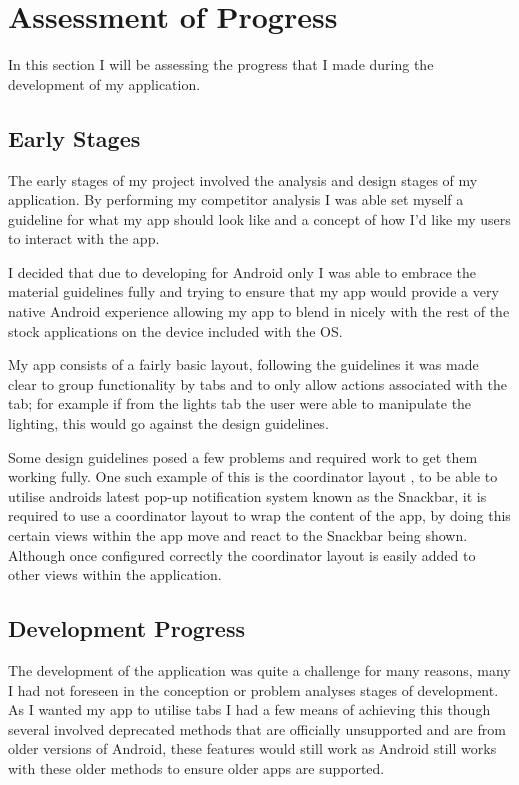 \section{Assessment of Progress}\label{assessment-of-progress}

In this section I will be assessing the progress that I made during the
development of my application.

\subsection{Early Stages}\label{early-stages}

The early stages of my project involved the analysis and design stages
of my application. By performing my competitor analysis I was able set
myself a guideline for what my app should look like and a concept of how
I'd like my users to interact with the app.

I decided that due to developing for Android only I was able to embrace
the material guidelines fully and trying to ensure that my app would
provide a very native Android experience allowing my app to blend in
nicely with the rest of the stock applications on the device included
with the OS.

My app consists of a fairly basic layout, following the guidelines it
was made clear to group functionality by tabs and to only allow actions
associated with the tab; for example if from the lights tab the user
were able to manipulate the lighting, this would go against the design
guidelines.

Some design guidelines posed a few problems and required work to get
them working fully. One such example of this is the coordinator layout
\parencite{coordinator}, to be able to utilise androids latest pop-up
notification system known as the Snackbar, it is required to use a
coordinator layout to wrap the content of the app, by doing this certain
views within the app move and react to the Snackbar being shown.
Although once configured correctly the coordinator layout is easily
added to other views within the application.

\subsection{Development Progress}\label{development-progress}

The development of the application was quite a challenge for many
reasons, many I had not foreseen in the conception or problem analyses
stages of development. As I wanted my app to utilise tabs I had a few
means of achieving this though several involved deprecated methods that
are officially unsupported and are from older versions of Android, these
features would still work as Android still works with these older
methods to ensure older apps are supported.

